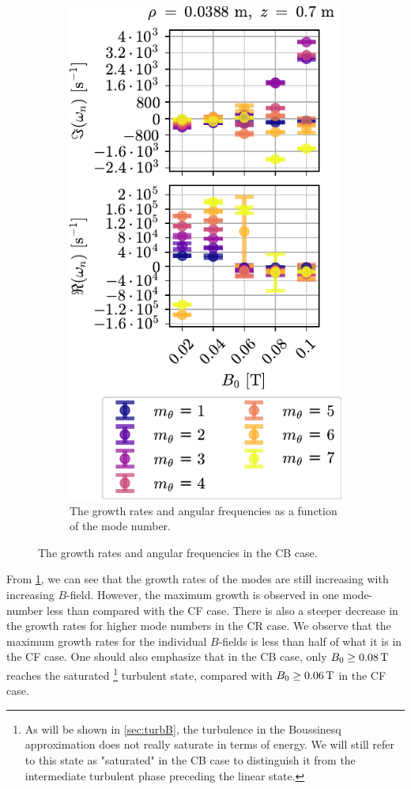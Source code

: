 \begin{figure}[htbp]
\begin{subfigure}[h]{0.45\textwidth}
        \includegraphics{fig/results/compareBouss/growthRatesB0Bous}
        \caption{The growth rates and angular frequencies as a function of the mode number.}
        \label{fig:GRBM}
    \end{subfigure}%
    \caption{The growth rates and angular frequencies in the CB case.}
    \label{fig:GRB}
\end{figure}
%
From \cref{fig:GRBM}, we can see that the growth rates of the modes are still increasing with increasing $B$-field.
However, the maximum growth is observed in one mode-number less than compared with the CF case.
There is also a steeper decrease in the growth rates for higher mode numbers in the CR case.
We observe that the maximum growth rates for the individual $B$-fields is less than half of what it is in the CF case.
One should also emphasize that in the CB case, only $B_0 \geq 0.08\, \text{T}$ reaches the saturated%
\footnote{As will be shown in \cref{sec:turbB}, the turbulence in the Boussinesq approximation does not really saturate in terms of energy.
    We will still refer to this state as "saturated" in the CB case to distinguish it from the intermediate turbulent phase preceding the linear state.
} %
%
turbulent state, compared with $B_0 \geq 0.06\, \text{T}$ in the CF case.

